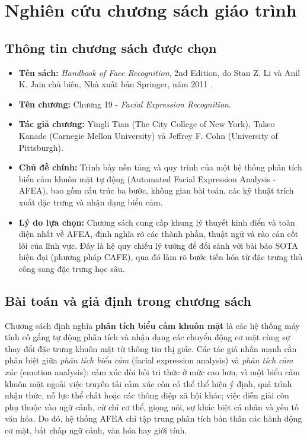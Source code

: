 \section{Nghiên cứu chương sách giáo trình}

\subsection{Thông tin chương sách được chọn}
\begin{itemize}
    \item \textbf{Tên sách:} \textit{Handbook of Face Recognition}, 2nd Edition, do Stan Z. Li và Anil K. Jain chủ biên, Nhà xuất bản Springer, năm 2011 \cite{li2011handbook}.
    \item \textbf{Tên chương:} Chương 19 - \textit{Facial Expression Recognition}.
    \item \textbf{Tác giả chương:} Yingli Tian (The City College of New York), Takeo Kanade (Carnegie Mellon University) và Jeffrey F. Cohn (University of Pittsburgh).
    \item \textbf{Chủ đề chính:} Trình bày nền tảng và quy trình của một hệ thống phân tích biểu cảm khuôn mặt tự động (Automated Facial Expression Analysis - AFEA), bao gồm cấu trúc ba bước, không gian bài toán, các kỹ thuật trích xuất đặc trưng và nhận dạng biểu cảm.
    \item \textbf{Lý do lựa chọn:} Chương sách cung cấp khung lý thuyết kinh điển và toàn diện nhất về AFEA, định nghĩa rõ các thành phần, thuật ngữ và rào cản cốt lõi của lĩnh vực. Đây là hệ quy chiếu lý tưởng để đối sánh với bài báo SOTA hiện đại (phương pháp CAFE), qua đó làm rõ bước tiến hóa từ đặc trưng thủ công sang đặc trưng học sâu.
\end{itemize}

\subsection{Bài toán và giả định trong chương sách}
Chương sách định nghĩa \textbf{phân tích biểu cảm khuôn mặt} là các hệ thống máy tính cố gắng tự động phân tích và nhận dạng các chuyển động cơ mặt cùng sự thay đổi đặc trưng khuôn mặt từ thông tin thị giác. Các tác giả nhấn mạnh cần phân biệt giữa \textit{phân tích biểu cảm} (facial expression analysis) và \textit{phân tích cảm xúc} (emotion analysis): cảm xúc đòi hỏi tri thức ở mức cao hơn, vì một biểu cảm khuôn mặt ngoài việc truyền tải cảm xúc còn có thể thể hiện ý định, quá trình nhận thức, nỗ lực thể chất hoặc các thông điệp xã hội khác; việc diễn giải còn phụ thuộc vào ngữ cảnh, cử chỉ cơ thể, giọng nói, sự khác biệt cá nhân và yếu tố văn hóa. Do đó, hệ thống AFEA chỉ tập trung phân tích bản thân các hành động cơ mặt, bất chấp ngữ cảnh, văn hóa hay giới tính.

